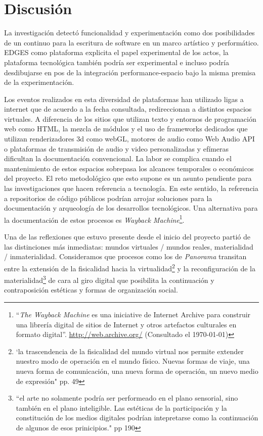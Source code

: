 
\section*{Discusión}

La investigación detectó funcionalidad y experimentación como dos posibilidades de un continuo para la escritura de software en un marco artístico y performático. EDGES como plataforma explicita el papel experimental de los actos, la plataforma tecnológica también podría ser experimental e incluso podría desdibujarse en pos de la integración performance-espacio bajo la misma premisa de la experimentación. 

Los eventos realizados en esta diversidad de plataformas han utilizado ligas a internet que de acuerdo a la fecha consultada, redireccionan a distintos espacios virtuales. A diferencia de los sitios que utilizan texto y entornos de programación web como HTML, la mezcla de módulos y el uso de frameworks dedicados que utilizan renderizadores 3d como webGL, motores de audio como Web Audio API o plataformas de transmisión de audio y video personalizadas y efímeras dificultan la documentación convencional. La labor se complica cuando el mantenimiento de estos espacios sobrepasa los alcances temporales o económicos del proyecto. El reto metodológico que esto supone es un asunto pendiente para las investigaciones que hacen referencia a tecnología. En este sentido, la referencia a repositorios de código públicos podrían arrojar soluciones para la documentación y arqueología de los desarrollos tecnológicos. Una alternativa para la documentación de estos procesos es \textit{Wayback Machine}\footnote{``\textit{The Wayback Machine} es una iniciative de Internet Archive para construir una librería digital de sitios de Internet y otros artefactos culturales en formato digital''. \url{http://web.archive.org/} (Consultado el \today)}. 

Una de las reflexiones que estuvo presente desde el inicio del proyecto partió de las distinciones más inmediatas: mundos virtuales / mundos reales, materialidad / inmaterialidad. Consideramos que procesos como los de \textit{Panorama} transitan entre la extensión de la fisicalidad hacia la virtualidad\footnote{`la trascendencia de la fisicalidad del mundo virtual nos permite extender nuestro modo de operación en el mundo físico. Nuevas formas de viaje, una nueva forma de comunicación, una nueva forma de operación, un nuevo medio de expresión" pp. 49} \citep{cyberspace} y la reconfiguración de la materialidad\footnote{``el arte no solamente podría ser performeado en el plano sensorial, sino también en el plano inteligible. Las estéticas de la participación y la constitución de los medios digitales podrían intepretarse como la continuación de algunos de esos prinicipios." pp 190} \citep{andreasosa} de cara al giro digital que posibilita la continuación y contraposición estéticas y formas de organización social. 

